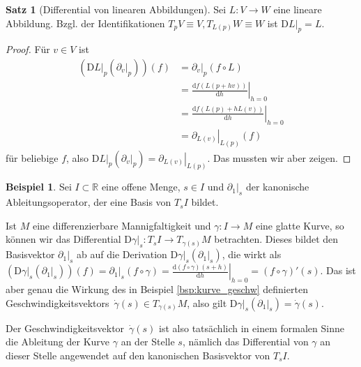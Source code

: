 \documentclass[a4paper]{scrbook}
\numberwithin{equation}{chapter}
\newcommand{\D}{\mathrm{d}}
\newcommand{\DD}{\mathrm{D}}
\theoremstyle{definition}
\newtheorem{satz}[defn]{Satz}
\newtheorem{bsp}[defn]{Beispiel}
\begin{document}
\begin{satz}[Differential von linearen Abbildungen]
	Sei $L\colon V \to W$ eine lineare Abbildung. Bzgl. der Identifikationen $T_pV \equiv V, T_{L(p)}W \equiv W$ ist $\left.\DD L\right|_p = L$.

	\begin{center}
	\end{center}

	\begin{proof}
		Für $v\in V$ ist
		\begin{align*}
			\left(\left.\DD L\right|_p \left( \left.\partial_v\right|_p \right)\right) (f) &= \left.\partial_v\right|_p (f \circ L)\\
			&= \left.\frac{\D f(L(p + h v))}{\D h}\right|_{h=0}\\
			&= \left.\frac{\D f(L(p) + h L(v))}{\D h}\right|_{h=0}\\
			&= \left.\partial_{L(v)}\right|_{L(p)} (f)
		\end{align*}
		für beliebige $f$, also $\left.\DD L\right|_p \left( \left.\partial_v\right|_p \right) = \left.\partial_{L(v)}\right|_{L(p)}$.
		Das mussten wir aber zeigen.
	\end{proof}
\end{satz}

\begin{bsp} \label{bsp:abl_kurve_differential}
	Sei $I \subset \mathbb R$ eine offene Menge, $s \in I$ und $\left.\partial_1\right|_s$ der kanonische Ableitungsoperator, der eine Basis von $T_s I$ bildet.

	Ist $M$ eine differenzierbare Mannigfaltigkeit und $\gamma\colon I \to M$ eine glatte Kurve, so können wir das Differential $\left.\DD \gamma\right|_s \colon T_sI \to T_{\gamma(s)} M$ betrachten. Dieses bildet den Basisvektor $\left.\partial_1\right|_s$ ab auf die Derivation $\left.\DD \gamma\right|_s(\left.\partial_1\right|_s)$, die wirkt als $\left(\left.\DD \gamma\right|_s(\left.\partial_1\right|_s)\right)(f) = \left.\partial_1\right|_s (f\circ\gamma) = \left.\frac{\D(f\circ\gamma)(s + h)}{\D h}\right|_{h=0} = (f\circ\gamma)'(s)$. Das ist aber genau die Wirkung des in Beispiel \ref{bsp:kurve_geschw} definierten \glqq Geschwindigkeitsvektors\grqq\ $\dot\gamma(s) \in T_{\gamma(s)} M$, also gilt $\left.\DD \gamma\right|_s(\left.\partial_1\right|_s) = \dot\gamma(s)$.

	Der \glqq Geschwindigkeitsvektor\grqq\ $\dot\gamma(s)$ ist also tatsächlich in einem formalen Sinne die Ableitung der Kurve $\gamma$ an der Stelle $s$, nämlich das Differential von $\gamma$ an dieser Stelle angewendet auf den kanonischen Basisvektor von $T_sI$.
\end{bsp}
\end{document}
